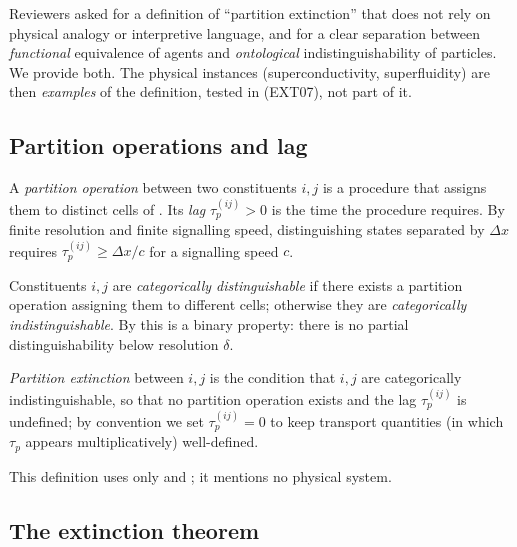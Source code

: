 \documentclass[11pt,twocolumn,a4paper]{article}
\newcommand{\tauP}{\tau_p}
\begin{document}
Reviewers asked for a definition of ``partition extinction'' that does not rely
on physical analogy or interpretive language, and for a clear separation
between \emph{functional} equivalence of agents and \emph{ontological}
indistinguishability of particles. We provide both. The physical instances
(superconductivity, superfluidity) are then \emph{examples} of the definition,
tested in  (EXT07), not part of it.

\subsection{Partition operations and lag}

\begin{definition}\label{def:partition-op}
A \emph{partition operation} between two constituents $i,j$ is a procedure that
assigns them to distinct cells of . Its \emph{lag}
$\tauP^{(ij)}>0$ is the time the procedure requires. By finite resolution and
finite signalling speed, distinguishing states separated by $\Delta x$ requires
$\tauP^{(ij)}\ge\Delta x/c$ for a signalling speed $c$.
\end{definition}

\begin{definition}\label{def:distinguishability}
Constituents $i,j$ are \emph{categorically distinguishable} if there exists a
partition operation assigning them to different cells; otherwise they are
\emph{categorically indistinguishable}. By  this is a binary
property: there is no partial distinguishability below resolution $\delta$.
\end{definition}

\begin{definition}\label{def:extinction}
\emph{Partition extinction} between $i,j$ is the condition that $i,j$ are
categorically indistinguishable, so that no partition operation exists and the
lag $\tauP^{(ij)}$ is undefined; by convention we set $\tauP^{(ij)}=0$ to keep
transport quantities (in which $\tauP$ appears multiplicatively) well-defined.
\end{definition}

This definition uses only  and ; it
mentions no physical system.

\subsection{The extinction theorem}
\end{document}
